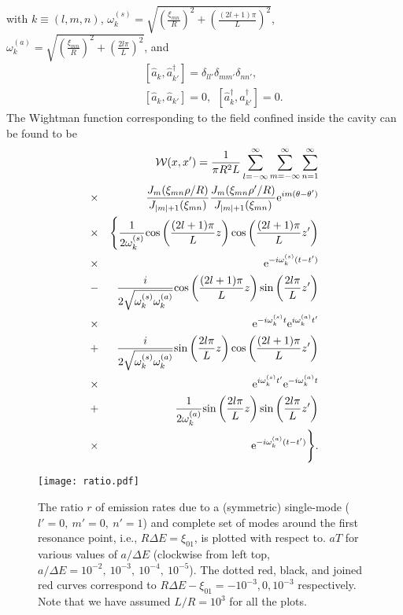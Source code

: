 \documentclass[aps,prl,nofootinbib,preprintnumbers,floatfix,twocolumn,superscriptaddress]{revtex4}
\def\nn{\nonumber}
\def\nn{\nonumber}
\def\l{\left}
\def\r{\right}
\def\f{\frac}
\def\e{{\rm e}}
\begin{document}
with $k\equiv(l,m,n)$, 
$\omega^{(s)}_{k}=\sqrt{\l(\f{\xi_{mn}}{R}\r)^2+\l(\f{(2l+1)\pi}{L}\r)^2}$, 
$\omega^{(a)}_{k}=\sqrt{\l(\f{\xi_{mn}}{R}\r)^2+\l(\f{2l\pi}{L}\r)^2}$, and 
\begin{eqnarray}
 && [{\hat a}_{k},{\hat a}_{k'}^{\dagger}]=\delta_{ll'} \delta_{mm'} \delta_{nn'}, \\ 
 && [{\hat a}_{k},{\hat a}_{k'}]=0, ~~ 
 [{\hat a}_{k}^{\dagger},{\hat a}_{k'}^{\dagger}]=0. 
\end{eqnarray}
The Wightman function corresponding to the field confined inside the cavity can be found 
to be 
\begin{eqnarray}
 &&{\cal W}(x,x')=\f{1}{\pi R^2L} 
 \sum_{l=-\infty}^{\infty} \sum_{m=-\infty}^{\infty}\sum_{n=1}^{\infty} \nn \\ 
 &\times&\f{J_{m}(\xi_{mn} \rho/R)}{J_{|m|+1}(\xi_{mn})} 
 \f{J_{m}(\xi_{mn} \rho'/R)}{J_{|m|+1}(\xi_{mn})} \e^{im(\theta-\theta')} \nn \\ 
 &\times& \Biggl\{\f{1}{2\omega^{(s)}_{k}} {\rm cos}\l(\f{(2l+1)\pi}{L}z\r) 
 {\rm cos}\l(\f{(2l+1)\pi}{L}z'\r) \nn \\ 
 &\times& \e^{-i\omega^{(s)}_k (t-t')} \nn \\ 
 &-&\f{i}{2\sqrt{\omega^{(s)}_{k} \omega^{(a)}_{k}}} {\rm cos}\l(\f{(2l+1)\pi}{L}z\r) 
 {\rm sin}\l(\f{2l\pi}{L}z'\r) \nn \\ 
 &\times& \e^{-i\omega^{(s)}_kt} \e^{i\omega^{(a)}_{k}t'} \nn \\ 
 &+&\f{i}{2\sqrt{\omega^{(s)}_{k} \omega^{(a)}_{k}}} {\rm sin}\l(\f{2l\pi}{L}z\r) 
 {\rm cos}\l(\f{(2l+1)\pi}{L}z'\r) \nn \\ 
 &\times& \e^{i\omega^{(s)}_kt'} \e^{-i\omega^{(a)}_{k}t} \nn \\ 
 &+&\f{1}{2\omega^{(a)}_{k}} {\rm sin}\l(\f{2l\pi}{L}z\r) {\rm sin}\l(\f{2l\pi}{L}z'\r) \nn \\ 
 &\times& \e^{-i\omega^{(a)}_k (t-t')}\Biggr\}. 
\end{eqnarray}
\begin{figure}[!htb]
\begin{center}
\texttt{[image: ratio.pdf]} 
\caption{The ratio $r$ of emission rates due to a (symmetric) single-mode 
($l'=0,~m'=0,~n'=1$) and complete set of modes around the first resonance 
point, i.e., $R\Delta E=\xi_{01}$, is plotted with respect to. $aT$ for various values of 
$a/\Delta E$ (clockwise from left top, $a/\Delta E=10^{-2},~10^{-3},~10^{-4},~10^{-5}$). 
The dotted red, black, and joined red curves correspond to 
$R\Delta E-\xi_{01}=-10^{-3},0,10^{-3}$ respectively. Note that we 
have assumed $L/R=10^{3}$ for all the plots.}
\label{fig:ratio}
\end{center}
\end{figure}
\end{document}
